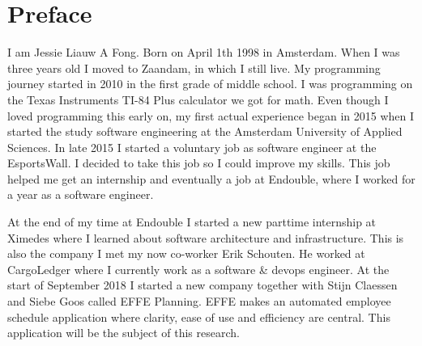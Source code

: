 \chapter*{Preface}

I am Jessie Liauw A Fong. Born on April 1th 1998 in Amsterdam. When I was three years old I moved to Zaandam, in which I still live. My programming journey started in 2010 in the first grade of middle school. I was programming on the Texas Instruments TI-84 Plus calculator we got for math. Even though I loved programming this early on, my first actual experience began in 2015 when I started the study software engineering at the Amsterdam University of Applied Sciences. In late 2015 I started a voluntary job as software engineer at the EsportsWall. I decided to take this job so I could improve my skills. This job helped me get an internship and eventually a job at Endouble, where I worked for a year as a software engineer.

At the end of my time at Endouble I started a new parttime internship at Ximedes where I learned about software architecture and infrastructure. This is also the company I met my now co-worker Erik Schouten. He worked at CargoLedger where I currently work as a software \& devops engineer. At the start of September 2018 I started a new company together with Stijn Claessen and Siebe Goos called EFFE Planning. EFFE makes an automated employee schedule application where clarity, ease of use and efficiency are central. This application will be the subject of this research.
